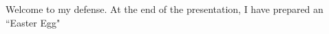 \documentclass[a4paper,12pt]{letter}
\begin{document}
\Large
\centering
Welcome to my defense.
\vskip3cm
At the end of the presentation, I have prepared an ``Easter Egg"
\end{document}
